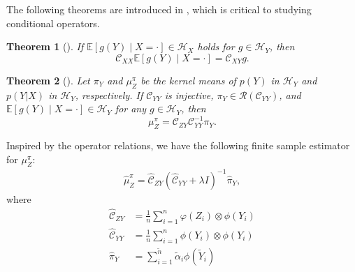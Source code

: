 \documentclass[a4paper]{article}
\renewcommand{\cal}{\mathcal}
\newcommand{\bb}{\mathbb}
\newtheorem{theorem}{Theorem}
\begin{document}
The following theorems are introduced in \cite{fukumizu2004dimensionality}\cite{song2009hilbert}\cite{fukumizu2011kernel}, which is critical to studying conditional operators.
\begin{theorem}[\cite{fukumizu2004dimensionality}\cite{fukumizu2011kernel}]
If $\bb{E}[g(Y)\mid X=\cdot] \in \cal{H}_X$ holds for $g \in \cal{H}_Y$, then
\begin{equation}
\cal{C}_{XX}\bb{E}[g(Y)\mid X=\cdot] = \cal{C}_{XY}g.
\end{equation}
\end{theorem}
\begin{theorem}[\cite{song2009hilbert}\cite{fukumizu2011kernel}]
Let $\pi_{Y}$ and $\mu_Z^\pi$ be the kernel means of $p(Y)$ in $\cal{H}_Y$ and $p(Y|X)$ in $\cal{H}_Y$, respectively. If $\cal{C}_{YY}$ is injective, $\pi_Y\in \cal{R}(\cal{C}_{YY})$, and $\bb{E}[g(Y)\mid X=\cdot]\in \cal{H}_Y$ for any $g\in \cal{H}_Y$, then
\begin{equation}
\mu_Z^\pi = \cal{C}_{ZY}\cal{C}_{YY}^{-1}\pi_Y.
\end{equation}
\end{theorem}
Inspired by the operator relations, we have the following finite sample estimator for $\mu_Z^\pi$:
\begin{align}
\widehat{\mu}_Z^\pi = \widehat{\cal{C}}_{ZY}(\widehat{\cal{C}}_{YY}+\lambda I)^{-1}\widehat{\pi}_Y,
\end{align}
where
\begin{align}
\widehat{\cal{C}}_{ZY} &= \frac{1}{n}\sum_{i=1}^n \varphi(Z_i) \otimes \phi(Y_i)\\
\widehat{\cal{C}}_{YY} &= \frac{1}{n}\sum_{i=1}^n \phi(Y_i) \otimes \phi(Y_i)\\
\widehat{\pi}_Y &= \sum_{i=1}^{\tilde{n}} \tilde{\alpha}_i \phi(\tilde{Y}_i)
\end{align}
\end{document}
